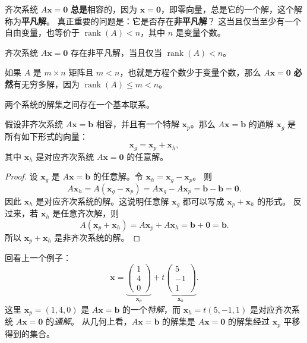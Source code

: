 齐次系统 $A\mathbf{x}=\mathbf{0}$ \textbf{总是}相容的，因为 $\mathbf{x}=\mathbf{0}$，即零向量，总是它的一个解，这个解称为\textbf{平凡解}。
真正重要的问题是：它是否存在\textbf{非平凡解}？
这当且仅当至少有一个自由变量，也等价于 $\operatorname{rank}(A)<n$，其中 $n$ 是变量个数。

\begin{theorem}
齐次系统 $A\mathbf{x}=\mathbf{0}$ 存在非平凡解，当且仅当 $\operatorname{rank}(A)<n$。
\end{theorem}
\begin{corollary}
如果 $A$ 是 $m\times n$ 矩阵且 $m<n$，也就是方程个数少于变量个数，那么 $A\mathbf{x}=\mathbf{0}$ \textbf{必然}有无穷多解，因为 $\operatorname{rank}(A)\leq m<n$。
\end{corollary}

两个系统的解集之间存在一个基本联系。

\begin{theorem}[解的结构]
假设非齐次系统 $A\mathbf{x}=\mathbf{b}$ 相容，并且有一个特解 $\mathbf{x}_p$。那么 $A\mathbf{x}=\mathbf{b}$ 的通解 $\mathbf{x}_g$ 是所有如下形式的向量：
\[ \mathbf{x}_g=\mathbf{x}_p+\mathbf{x}_h, \]
其中 $\mathbf{x}_h$ 是对应齐次系统 $A\mathbf{x}=\mathbf{0}$ 的任意解。
\end{theorem}
\begin{proof}
设 $\mathbf{x}_g$ 是 $A\mathbf{x}=\mathbf{b}$ 的任意解。令 $\mathbf{x}_h=\mathbf{x}_g-\mathbf{x}_p$。
则
\[
A\mathbf{x}_h=A(\mathbf{x}_g-\mathbf{x}_p)=A\mathbf{x}_g-A\mathbf{x}_p=\mathbf{b}-\mathbf{b}=\mathbf{0}.
\]
因此 $\mathbf{x}_h$ 是对应齐次系统的解。这说明任意解 $\mathbf{x}_g$ 都可以写成 $\mathbf{x}_p+\mathbf{x}_h$ 的形式。
反过来，若 $\mathbf{x}_h$ 是任意齐次解，则
\[
A(\mathbf{x}_p+\mathbf{x}_h)=A\mathbf{x}_p+A\mathbf{x}_h=\mathbf{b}+\mathbf{0}=\mathbf{b}.
\]
所以 $\mathbf{x}_p+\mathbf{x}_h$ 是非齐次系统的解。
\end{proof}

\begin{remark}
回看上一个例子：
\[ \mathbf{x}=\underbrace{\begin{pmatrix}1\\4\\0\end{pmatrix}}_{\mathbf{x}_p}+t\underbrace{\begin{pmatrix}5\\-1\\1\end{pmatrix}}_{\mathbf{x}_h}. \]
这里 $\mathbf{x}_p=(1,4,0)$ 是 $A\mathbf{x}=\mathbf{b}$ 的一个\emph{特解}，而 $\mathbf{x}_h=t(5,-1,1)$ 是对应齐次系统 $A\mathbf{x}=\mathbf{0}$ 的\emph{通解}。
从几何上看，$A\mathbf{x}=\mathbf{b}$ 的解集是 $A\mathbf{x}=\mathbf{0}$ 的解集经过 $\mathbf{x}_p$ 平移得到的集合。
\end{remark}

